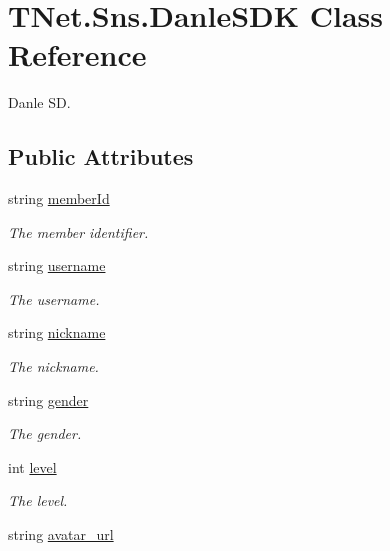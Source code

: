\hypertarget{class_t_net_1_1_sns_1_1_danle_s_d_k}{}\section{T\+Net.\+Sns.\+Danle\+S\+DK Class Reference}
\label{class_t_net_1_1_sns_1_1_danle_s_d_k}


Danle SD.  


\subsection*{Public Attributes}
\begin{DoxyCompactItemize}
\item 
string \mbox{\hyperlink{class_t_net_1_1_sns_1_1_danle_s_d_k_a59d62a9e83e558a45ad53e328690d9a5}{member\+Id}}
\begin{DoxyCompactList}\small\item\em The member identifier. \end{DoxyCompactList}\item 
string \mbox{\hyperlink{class_t_net_1_1_sns_1_1_danle_s_d_k_af129480f85aa59cc0e7fd8ec085a2437}{username}}
\begin{DoxyCompactList}\small\item\em The username. \end{DoxyCompactList}\item 
string \mbox{\hyperlink{class_t_net_1_1_sns_1_1_danle_s_d_k_a10f2424a331d33400dec4ff713185e97}{nickname}}
\begin{DoxyCompactList}\small\item\em The nickname. \end{DoxyCompactList}\item 
string \mbox{\hyperlink{class_t_net_1_1_sns_1_1_danle_s_d_k_a0db3c3775872ad2033aa411eef00b187}{gender}}
\begin{DoxyCompactList}\small\item\em The gender. \end{DoxyCompactList}\item 
int \mbox{\hyperlink{class_t_net_1_1_sns_1_1_danle_s_d_k_ac7afe22b7630a99966330a705e199689}{level}}
\begin{DoxyCompactList}\small\item\em The level. \end{DoxyCompactList}\item 
string \mbox{\hyperlink{class_t_net_1_1_sns_1_1_danle_s_d_k_aaca48e752c951729ca4351f3ede9bebc}{avatar\+\_\+url}}

\end{DoxyCompactItemize}
